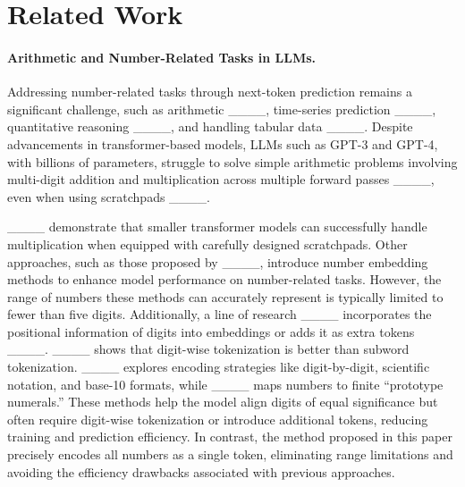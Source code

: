 \section{Related Work}
\paragraph{Arithmetic and Number-Related Tasks in LLMs.}
Addressing number-related tasks through next-token prediction remains a significant challenge, such as arithmetic ____,  time-series prediction ____, quantitative reasoning ____, and handling tabular data ____.
Despite advancements in transformer-based models, LLMs such as GPT-3 and GPT-4, with billions of parameters, struggle to solve simple arithmetic problems involving multi-digit addition and multiplication across multiple forward passes ____, even when using scratchpads ____. 

____ demonstrate that smaller transformer models can successfully handle multiplication when equipped with carefully designed scratchpads.
Other approaches, such as those proposed by ____, introduce number embedding methods to enhance model performance on number-related tasks. However, the range of numbers these methods can accurately represent is typically limited to fewer than five digits.
Additionally, a line of research ____ incorporates the positional information of digits into embeddings or adds it as extra tokens ____. ____ shows that digit-wise tokenization is better than subword tokenization. ____ explores encoding strategies like digit-by-digit, scientific notation, and base-10 formats, while ____ maps numbers to finite ``prototype numerals.'' These methods help the model align digits of equal significance but often require digit-wise tokenization or introduce additional tokens, reducing training and prediction efficiency.
In contrast, the method proposed in this paper precisely encodes all numbers as a single token, eliminating range limitations and avoiding the efficiency drawbacks associated with previous approaches.

 


